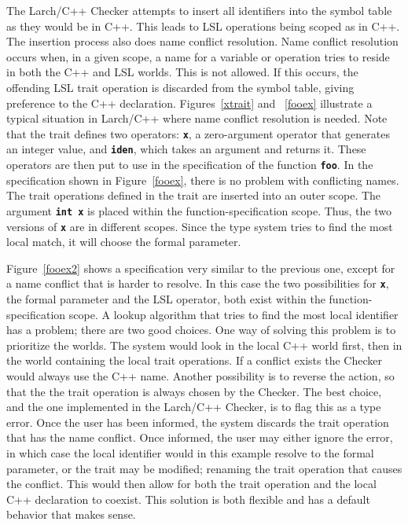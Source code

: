 \documentclass[12pt]{article} %
\newcommand{\reserved}[1]{\textbf{\texttt{#1}}} %
\begin{document}
The Larch/C++ Checker attempts to insert all identifiers into the
symbol table as they would be in C++. This leads to LSL operations
being scoped as in C++. The insertion process also does name conflict
resolution. Name conflict resolution occurs when, in a given scope, a
name for a variable or operation tries to reside in both the C++ and
LSL worlds. This is not allowed. If this occurs, the offending LSL
trait operation is discarded from the symbol table, giving preference
to the C++ declaration. Figures~\ref{xtrait} and ~\ref{fooex}
illustrate a typical situation in Larch/C++ where name conflict
resolution is needed. Note that the trait defines two operators:
\reserved{x}, a zero-argument operator that generates an integer value, and
\reserved{iden}, which takes an argument and returns it. These
operators are then put to use in the specification of the function
\reserved{foo}. In the specification shown in Figure~\ref{fooex}, there
is no problem with conflicting names. The trait operations defined in
the trait are inserted into an outer scope. The argument \reserved{int
x} is placed within the function-specification scope. Thus, the two
versions of \reserved{x} are in different scopes. Since the type
system tries to find the most local match, it will choose the formal
parameter. 

Figure~\ref{fooex2} shows a specification very similar to the previous
one, except for a name conflict that is harder to resolve.  In this
case the two possibilities for \reserved{x}, the formal parameter and
the LSL operator, both exist within the function-specification scope. A
lookup algorithm that tries to find the most local identifier has a
problem; there are two good choices. One way of solving this
problem is to prioritize the worlds. The system would look in the
local C++ world first, then in the world containing the local trait
operations. If a conflict exists the Checker would always use the C++
name. Another possibility is to reverse the action, so that the the trait
operation is always chosen by the Checker.
The best choice, and the one implemented
in the Larch/C++ Checker, is to flag this as a type error. Once the
user has been informed, the system discards the trait operation that
has the name conflict. Once informed, the user may either ignore the
error, in which case the local identifier would in this example
resolve to the formal parameter, or the trait may be modified; renaming
the trait operation that causes the conflict. This would then allow
for both the trait operation and the local C++ declaration to
coexist. This solution is both flexible and has a default behavior
that makes sense.
\end{document}
